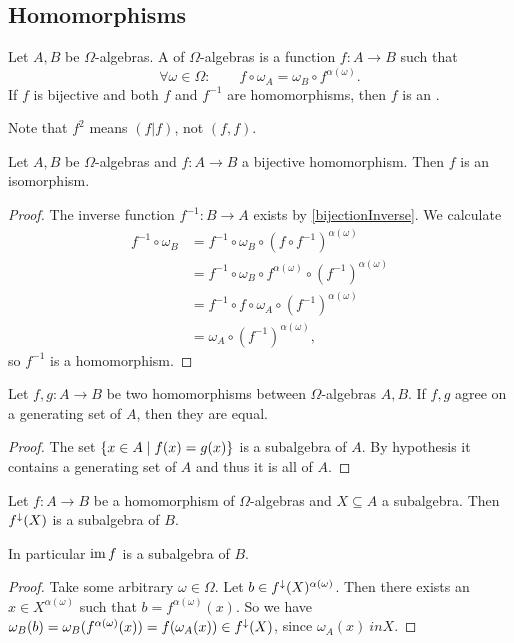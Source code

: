\subsection{Homomorphisms}
\begin{definition}
Let $A,B$ be $\Omega$-algebras. A  of $\Omega$-algebras is a function $f:A\to B$ such that
\[ \forall \omega\in\Omega: \qquad f\circ \omega_A = \omega_B\circ f^{\alpha(\omega)}. \]
If $f$ is bijective and both $f$ and $f^{-1}$ are homomorphisms, then $f$ is an .
\end{definition}
Note that $f^{2}$ means $(f|f)$, not $(f,f)$.

\begin{lemma} \label{inverseHomomorphism}
Let $A,B$ be $\Omega$-algebras and $f:A\to B$ a bijective homomorphism. Then $f$ is an isomorphism.
\end{lemma}
\begin{proof}
The inverse function $f^{-1}: B\to A$ exists by \ref{bijectionInverse}. We calculate
\begin{align*}
f^{-1}\circ \omega_B &= f^{-1}\circ \omega_B \circ (f\circ f^{-1})^{\alpha(\omega)} \\
&= f^{-1}\circ \omega_B \circ f^{\alpha(\omega)} \circ (f^{-1})^{\alpha(\omega)} \\
&= f^{-1}\circ f \circ \omega_A \circ (f^{-1})^{\alpha(\omega)} \\
&= \omega_A \circ (f^{-1})^{\alpha(\omega)},
\end{align*}
so $f^{-1}$ is a homomorphism.
\end{proof}

\begin{proposition}
Let $f,g:A\to B$ be two homomorphisms between $\Omega$-algebras $A,B$. If $f,g$ agree on a generating set of $A$, then they are equal.
\end{proposition}
\begin{proof}
The set $\setbuilder{x\in A}{f(x) = g(x)}$ is a subalgebra of $A$. By hypothesis it contains a generating set of $A$ and thus it is all of $A$.
\end{proof}

\begin{proposition} \label{imageSubalgebra}
Let $f:A\to B$ be a homomorphism of $\Omega$-algebras and $X\subseteq A$ a subalgebra. Then $f^{\downarrow}(X)$ is a subalgebra of $B$.
\end{proposition}
In particular $\operatorname{im} f$ is a subalgebra of $B$.
\begin{proof}
Take some arbitrary $\omega\in\Omega$. Let $b\in f^{\downarrow}(X)^{\alpha(\omega)}$. Then there exists an $x\in X^{\alpha(\omega)}$ such that $b = f^{\alpha(\omega)}(x)$. So we have $\omega_B(b) = \omega_B(f^{\alpha(\omega)}(x)) = f(\omega_A(x)) \in f^\downarrow(X)$, since $\omega_A(x)\ in X$.
\end{proof}


